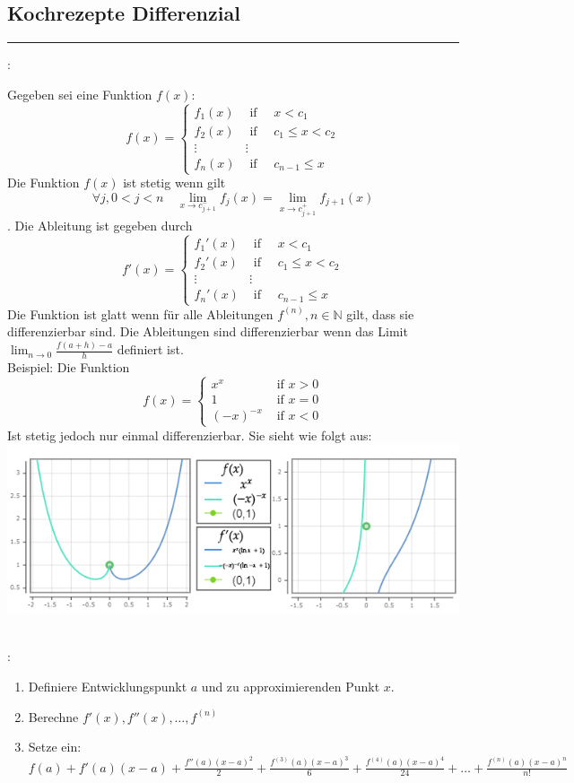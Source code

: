 \documentclass[7pt,landscape, margin = 0.1mm]{article}
\newcommand*{\mysubsection}[1]{\vspace{-2mm}\color{chaptercolor}\subsection{ #1 }
\vspace{-1mm}\hrule\vspace{1.5mm}\color{black}
\vspace{2mm}}
\newcommand{\KRZ}[2]{\vspace{1mm} \hline \vspace{1mm} \color{chaptercolor}{RC #1}:\color{black} \   \hspace{0.2cm}\vspace{1mm}   {\begin{minipage}{20em}
#2 \end{minipage}} \vspace{1mm}  \hline \vspace{1mm}  \\}
\begin{document}
\begin{multicols}{4}
\begin{flushleft}
\mysubsection{Kochrezepte Differenzial}
\KRZ{Differenzierbarkeit von "piecewise functions"}{
Gegeben sei eine Funktion $f(x)$:
$$ f(x)=\begin{cases}
f_1(x) & \text{ if  } \quad x < c_1 \\
f_2(x) & \text{ if  }  \quad c_1 \leq x < c_2 \\
 \vdots & \vdots \\
f_n(x)& \text{ if }  \quad  c_{n-1}\leq x
\end{cases}$$
Die Funktion $f(x)$ ist stetig wenn gilt $$\forall j, 0<j<n \quad \lim_{ x \to c_{j+1}^-} f_j(x) = \lim_{ x \to c_{j+1}^+} f_{j+1}(x)$$.
Die Ableitung ist gegeben durch $$ f'(x)=\begin{cases}
f_1'(x) & \text{ if  } \quad x < c_1 \\
f_2'(x) & \text{ if  }  \quad c_1 \leq x < c_2 \\
 \vdots & \vdots \\
f_n'(x)& \text{ if }  \quad  c_{n-1}\leq x
\end{cases}$$
Die Funktion ist glatt wenn für alle Ableitungen $f^{(n)}, n \in \mathbb{N}$ gilt, dass sie differenzierbar sind. Die Ableitungen sind differenzierbar wenn das Limit $\lim_{n \to 0}\frac{f(a+h)-a}{h}$ definiert ist. \\
Beispiel:
Die Funktion $$f(x) = \begin{cases}
x^x & \text{ if } x>0 \\
1 & \text{ if } x=0 \\
(-x)^{-x} & \text{ if } x<0 
\end{cases}$$
Ist stetig jedoch nur einmal differenzierbar. Sie sieht wie folgt aus:
\includegraphics[scale=0.3]{build/pictures/dg3.png} 
}
\KRZ{Finde Taylorpolynom n-ter Ordnung}{ \begin{enumerate}
\item Definiere Entwicklungspunkt $a$ und zu approximierenden Punkt $x$.
\item Berechne $f'(x) , f''(x), \ldots ,f^{(n)}$
\item Setze ein:$f(a)+f'(a)(x-a)+ \frac{f''(a)(x-a)^2}{2}+\frac{f^{(3)}(a)(x-a)^3}{6}+\frac{f^{(4)}(a)(x-a)^4}{24} + \ldots + \frac{f^{(n)}(a)(x-a)^n}{n!}$

\end{enumerate}}
\end{flushleft}
\end{multicols}
\end{document}
